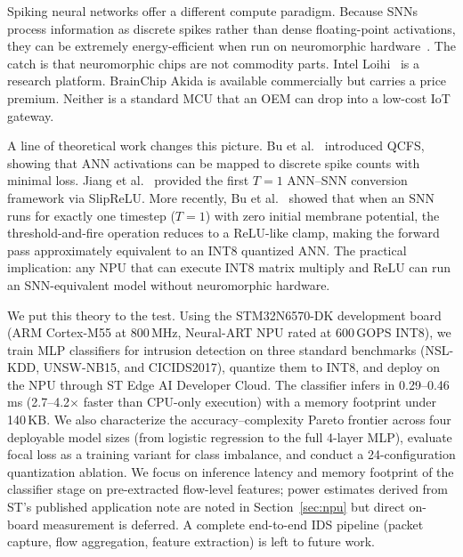 \documentclass[10pt,twocolumn]{article}
\begin{document}
Spiking neural networks offer a different compute paradigm. Because SNNs
process information as discrete spikes rather than dense floating-point
activations, they can be extremely energy-efficient when run on neuromorphic
hardware~\cite{roy2019towards}. The catch is that neuromorphic chips are not
commodity parts. Intel Loihi~\cite{davies2018loihi} is a research platform.
BrainChip Akida is available commercially but carries a price premium.
Neither is a standard MCU that an OEM can drop into a low-cost IoT gateway.

A line of theoretical work changes this picture.
Bu et al.~\cite{bu2022optimal} introduced QCFS, showing that ANN activations
can be mapped to discrete spike counts with minimal loss.
Jiang et al.~\cite{jiang2023unified} provided the first $T{=}1$ ANN--SNN
conversion framework via SlipReLU.
More recently,
Bu et al.~\cite{bu2025inference} showed that when an SNN runs for exactly
one timestep ($T{=}1$) with zero initial membrane potential, the
threshold-and-fire operation reduces to a ReLU-like clamp, making the forward
pass approximately equivalent to an INT8 quantized ANN.
The practical implication: any NPU that can execute INT8 matrix multiply
and ReLU can run an SNN-equivalent model without neuromorphic hardware.

We put this theory to the test. Using the STM32N6570-DK development board
(ARM Cortex-M55 at 800\,MHz, Neural-ART NPU rated at 600\,GOPS INT8),
we train MLP classifiers for intrusion detection on three standard
benchmarks (NSL-KDD, UNSW-NB15, and CICIDS2017), quantize them to
INT8, and deploy on the NPU through ST Edge AI Developer Cloud.
The classifier infers in 0.29--0.46\,ms (2.7--4.2$\times$ faster than
CPU-only execution) with a memory footprint under 140\,KB.
We also characterize the accuracy--complexity Pareto frontier across
four deployable model sizes (from logistic regression to the full
4-layer MLP), evaluate focal loss as a training variant for class
imbalance, and conduct a 24-configuration quantization ablation.
We focus on inference latency and memory footprint of the classifier
stage on pre-extracted flow-level features; power estimates derived from
ST's published application note are noted in Section~\ref{sec:npu} but
direct on-board measurement is deferred.
A complete end-to-end IDS pipeline (packet capture, flow aggregation,
feature extraction) is left to future work.
\end{document}
